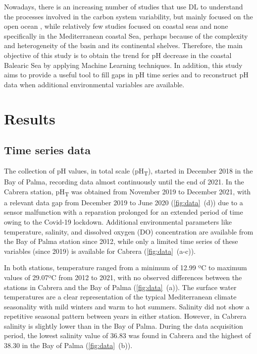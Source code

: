 Nowadays, there is an increasing number of studies that use  DL to
understand the processes involved in the carbon system variability, but mainly
focused on the open ocean \cite{Fourrier2020,Friedrich2009,Bittig2018,
    Landschützer2013,Broullon2019}, while relatively few studies focused on
coastal
seas \cite{Broullon2021,Contractor2021} and none specifically in the
Mediterranean coastal Sea, perhaps because of the complexity and heterogeneity
of the basin and its continental shelves. Therefore, the main objective of this
study is to obtain the trend for pH decrease in the coastal Balearic Sea by
applying Machine Learning techniques. In addition, this study aims to provide a
useful tool to fill gaps in pH time series and to reconstruct pH data when
additional environmental variables are available.

\section{Results}
\subsection{Time series data}

The collection of pH values, in total scale (pH\textsubscript{T}), started
in December 2018 in the Bay of Palma, recording data almost continuously until
the end of 2021. In the Cabrera station, pH\textsubscript{T} was obtained from
November 2019 to December 2021, with a relevant data gap from December 2019 to
June 2020 (\cref{fig:data}~\textcolor{ref_color}{(d)}) due to a sensor
malfunction with a reparation
prolonged for an extended period of time owing to the Covid-19 lockdown.
Additional environmental parameters like temperature, salinity, and dissolved
oxygen (DO) concentration are available from the Bay of Palma station since
2012, while only a limited time series of these variables (since 2019) is
available for Cabrera (\cref{fig:data}~\textcolor{ref_color}{(a-c)}).

In both stations, temperature ranged from a minimum of 12.99 ºC to maximum
values of 29.07ºC from 2012 to 2021, with no observed differences between the
stations in Cabrera and the Bay of Palma
(\cref{fig:data}~\textcolor{ref_color}{(a)}). The surface
water temperatures are a clear representation of the typical Mediterranean
climate seasonality with mild winters and warm to hot summers. Salinity did not
show a repetitive seasonal pattern between years in either station. However,
in Cabrera salinity is slightly lower than in the Bay of Palma. During the data
acquisition period, the lowest salinity value of 36.83 was found in Cabrera and
the highest of 38.30 in the Bay of Palma
(\cref{fig:data}~\textcolor{ref_color}{(b)}).

